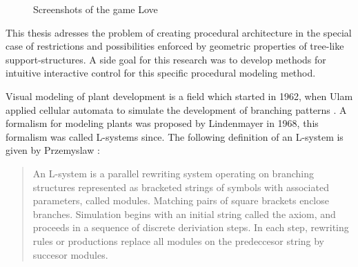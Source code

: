 \begin{figure}[ht]
\centering
{}

\label{fig:love}
\caption[]{Screenshots of the game Love}
\end{figure}


This thesis adresses the problem of creating procedural architecture in the special case of restrictions and possibilities enforced by geometric properties of tree-like support-structures. A side goal for this research was to develop methods for intuitive interactive control for this specific procedural modeling method. 



Visual modeling of plant development is a field which started in 1962, when Ulam applied cellular automata to 
simulate the development of branching patterns \citep{PrzemyslawPlants}. A formalism for modeling plants was proposed by Lindenmayer 
in 1968, this formalism was called L-systems since. The following definition of an L-system is given by Przemyslaw \citep{PrzemyslawPlants}: 

\begin{quote}
An L-system is a parallel rewriting system operating on branching structures represented as bracketed strings of symbols with associated parameters, called modules. Matching pairs of square brackets enclose branches. Simulation begins with an  initial string called the axiom, and proceeds in a sequence of discrete deriviation steps. In each step, rewriting rules or productions replace all modules on the predeccesor string by succesor modules.   
\end{quote}   

